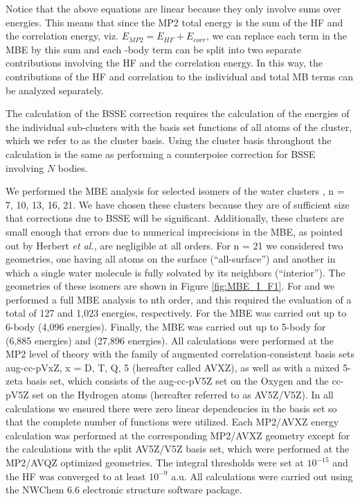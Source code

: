 \documentclass[11pt, proquest]{uwthesis}[2020/02/24]
\let\ce\ch
\begin{document}
Notice that the above equations are linear because they only involve sums over energies. This means that since the MP2 total energy is the sum of the HF and the correlation energy, viz. $E_{MP2}=E_{HF}+E_{corr}$, we can replace each term in the MBE by this sum and each -body term can be split into two separate contributions involving the HF and the correlation energy. In this way, the contributions of the HF and correlation to the individual and total MB terms can be analyzed separately.
\par The calculation of the BSSE correction requires the calculation of the energies of the individual sub-clusters with the basis set functions of all atoms of the cluster, which we refer to as the cluster basis. Using the cluster basis throughout the calculation is the same as performing a counterpoise correction for BSSE involving $N$ bodies.
\par We performed the MBE analysis for selected isomers of the water clusters \ce{(H2O)n}, n = 7, 10, 13, 16, 21.\autocite{lagutschenkov_spectroscopic_2005, yoo_high-level_2010, iwata_cooperative_2013, bulusu_lowest-energy_2006, yoo_structures_2017} We have chosen these clusters because they are of sufficient size that corrections due to BSSE will be significant. Additionally, these clusters are small enough that errors due to numerical imprecisions in the MBE, as pointed out by Herbert \textit{et al.},\autocite{richard_understanding_2014} are negligible at all orders. For n = 21 we considered two geometries, one having all atoms on the surface (“all-surface”) and another in which a single water molecule is fully solvated by its neighbors (“interior”). The geometries of these isomers are shown in Figure \ref{fig:MBE_I_F1}. For \ce{(H2O)7} and \ce{(H2O)_{10}} we performed a full MBE analysis to nth order, and this required the evaluation of a total of 127 and 1,023 energies, respectively. For \ce{(H2O)_{13}} the MBE was carried out up to 6-body (4,096 energies). Finally, the MBE was carried out up to 5-body for \ce{(H2O)_{16}} (6,885 energies) and \ce{(H2O)_{21}} (27,896 energies). All calculations were performed at the MP2 level of theory with the family of augmented correlation-consistent basis sets\autocite{dunning_gaussian_1989} aug-cc-pVxZ, x = D, T, Q, 5 (hereafter called AVXZ), as well as with a mixed 5-zeta basis set, which consists of the aug-cc-pV5Z set on the Oxygen and the cc-pV5Z set on the Hydrogen atoms (hereafter referred to as AV5Z/V5Z). In all calculations we ensured there were zero linear dependencies in the basis set so that the complete number of functions were utilized. Each MP2/AVXZ energy calculation was performed at the corresponding MP2/AVXZ geometry except for the calculations with the split AV5Z/V5Z basis set, which were performed at the MP2/AVQZ optimized geometries. The integral thresholds were set at $10^{-15}$ and the HF was converged to at least $10^{-9}$ a.u. All calculations were carried out using the NWChem 6.6 electronic structure software package.\autocite{valiev_nwchem_2010}
\end{document}

